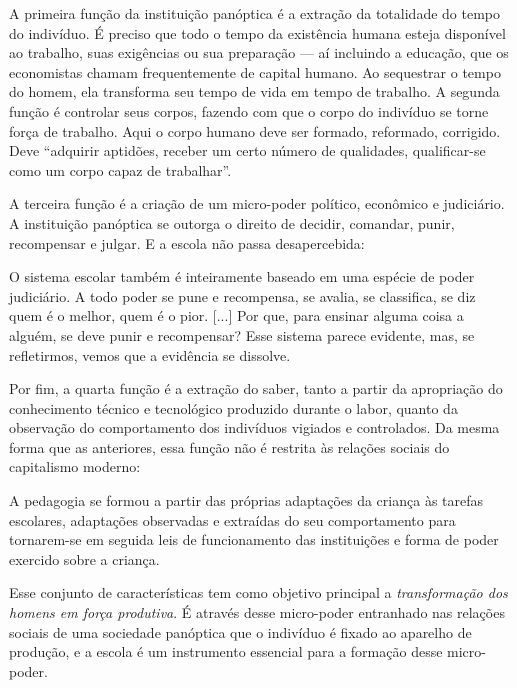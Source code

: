 \documentclass[
  12pt,
  letterpaper,
  DIV=11,
  numbers=noendperiod]{scrartcl}
\newenvironment{citacao}
    {\begin{quoting}[rightmargin=0cm,leftmargin=4cm]
    \begin{singlespace}
    \footnotesize
    }
    {\end{singlespace}
    \end{quoting}
}
\begin{document}
A primeira função da instituição panóptica é a extração da totalidade do
tempo do indivíduo. É preciso que todo o tempo da existência humana
esteja disponível ao trabalho, suas exigências ou sua preparação --- aí
incluindo a educação, que os economistas chamam frequentemente de
capital humano. Ao sequestrar o tempo do homem, ela transforma seu tempo
de vida em tempo de trabalho. A segunda função é controlar seus corpos,
fazendo com que o corpo do indivíduo se torne força de trabalho. Aqui o
corpo humano deve ser formado, reformado, corrigido. Deve ``adquirir
aptidões, receber um certo número de qualidades, qualificar-se como um
corpo capaz de trabalhar''.

A terceira função é a criação de um micro-poder político, econômico e
judiciário. A instituição panóptica se outorga o direito de decidir,
comandar, punir, recompensar e julgar. E a escola não passa
desapercebida:

\begin{citacao}
O sistema escolar também é inteiramente baseado em uma espécie de poder judiciário. A todo poder se pune e recompensa, se avalia, se classifica, se diz quem é o melhor, quem é o pior. [...] Por que, para ensinar alguma coisa a alguém, se deve punir e recompensar? Esse sistema parece evidente, mas, se refletirmos, vemos que a evidência se dissolve. \citep[p.~120]{foucault}
\end{citacao}

Por fim, a quarta função é a extração do saber, tanto a partir da
apropriação do conhecimento técnico e tecnológico produzido durante o
labor, quanto da observação do comportamento dos indivíduos vigiados e
controlados. Da mesma forma que as anteriores, essa função não é
restrita às relações sociais do capitalismo moderno:

\begin{citacao}
A pedagogia se formou a partir das próprias adaptações da criança às tarefas escolares, adaptações observadas e extraídas do seu comportamento para tornarem-se em seguida leis de funcionamento das instituições e forma de poder exercido sobre a criança. \citep[p.~122]{foucault}
\end{citacao}

Esse conjunto de características tem como objetivo principal a
\emph{transformação dos homens em força produtiva}. É através desse
micro-poder entranhado nas relações sociais de uma sociedade panóptica
que o indivíduo é fixado ao aparelho de produção, e a escola é um
instrumento essencial para a formação desse micro-poder.
\end{document}
